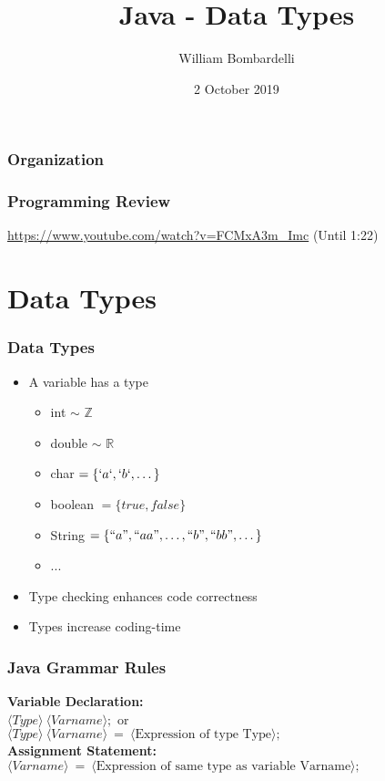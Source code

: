 \documentclass{beamer}
\title[Java]{Java - Data Types}
\author[W. Bombardelli]{William Bombardelli}
\institute[Schweizerschule Mexiko]
{
	\vskip 12pt
	Schweizerschule Mexiko, Ciudad de México, Mexico \\
	\texttt{\url{https://github.com/wbombardellis/java-unterricht}}
}
\date{2 October 2019}
\begin{document}
	\begin{frame}
		\titlepage
	\end{frame}
	
	\begin{frame}
		\frametitle{Organization}
		\tableofcontents
	\end{frame}

	\begin{frame}
		\frametitle{Programming Review}
		\url{https://www.youtube.com/watch?v=FCMxA3m_Imc} (Until 1:22)
	\end{frame}

	\section{Data Types}
	\begin{frame}
		\frametitle{Data Types}
		\begin{itemize}
			\item A variable has a type
			\begin{itemize}
				\item int $\sim$ $\mathbb{Z}$
				\item double $\sim$ $\mathbb{R}$
				\item char $= \{`a`, `b`, \dots \}$
				\item boolean $= \{true, false\}$
				\item String $= \{``a", ``aa", \dots, ``b", ``bb", \dots \}$
				\item ...
			\end{itemize}
			\pause
			\item {\color{green} Type checking enhances code correctness}
			\pause
			\item {\color{red} Types increase coding-time}
		\end{itemize}
	\end{frame}

	\begin{frame}
		\frametitle{Java Grammar Rules}
		\textbf{Variable Declaration:}\\
		$\langle Type \rangle\ \langle Varname \rangle;$ or\\
		$\langle Type \rangle\ \langle Varname \rangle\ =\ \langle \text{Expression of type Type}\rangle;$\\
		\vskip20pt
		\textbf{Assignment Statement:}\\
		$\langle Varname \rangle\ =\ \langle \text{Expression of same type as variable Varname}\rangle;$\\
	\end{frame}
\end{document}
